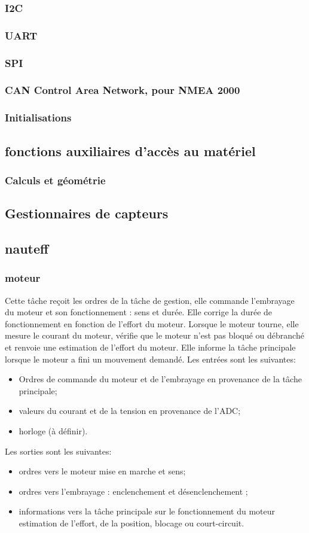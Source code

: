 \documentclass[a4paper,11pt]{report}
\begin{document}
\subsubsection{I2C}
\subsubsection{UART}
\subsubsection{SPI}
\subsubsection{CAN Control Area Network, pour NMEA 2000}
\subsubsection{Initialisations}
\subsection{fonctions auxiliaires d'accès au matériel}
\subsubsection{Calculs et géométrie}
\subsection{Gestionnaires de capteurs}

\subsection{nauteff}
\subsubsection{moteur}
Cette tâche reçoit les ordres de la tâche de gestion,
elle commande l'embrayage du moteur et son fonctionnement : sens et durée.
Elle corrige la durée de fonctionnement en fonction de l'effort du moteur.
Lorsque le moteur tourne, elle mesure le courant du moteur,
vérifie que le moteur n'est pas bloqué ou débranché et
renvoie une estimation de l'effort du moteur. Elle informe la tâche principale
lorsque le moteur a fini un mouvement demandé.
Les entrées sont les suivantes:
\begin{itemize}
	\item Ordres de commande du moteur et de l'embrayage en provenance de la tâche principale;
	\item valeurs du courant et de la tension en provenance de l'ADC;
	\item horloge (à définir).
\end{itemize}
Les sorties sont les suivantes:
\begin{itemize}
	\item ordres vers le moteur mise en marche et sens;
	\item ordres vers l'embrayage : enclenchement et désenclenchement ;
	\item informations vers la tâche principale sur le fonctionnement du moteur estimation de l'effort, de la position, blocage ou court-circuit.
\end{itemize}
\end{document}
